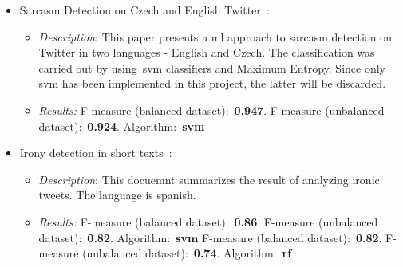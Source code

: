 \begin{itemize}
	\item Sarcasm Detection on Czech and English Twitter~\cite{ptavcek2014sarcasm}:
	\begin{itemize}
		\item \textit{Description}: This paper presents a \ac{ml} approach to sarcasm detection on Twitter in two languages - English and Czech. The classification was carried out by using~\ac{svm} classifiers and Maximum Entropy. Since only \ac{svm} has been implemented in this project, the latter will be discarded.
		\item \textit{Results:} F-measure (balanced dataset):~\textbf{0.947}. F-measure (unbalanced dataset):~\textbf{0.924}. Algorithm:~\textbf{\ac{svm}}
	\end{itemize}
	\item Irony detection in short texts~\cite{mexic}:
	\begin{itemize}
		\item \textit{Description}: This docuemnt summarizes the result of analyzing ironic tweets. The language is spanish.
		\item \textit{Results:} F-measure (balanced dataset):~\textbf{0.86}. F-measure (unbalanced dataset):~\textbf{0.82}. Algorithm:~\textbf{\ac{svm}}
		F-measure (balanced dataset):~\textbf{0.82}. F-measure (unbalanced dataset):~\textbf{0.74}. Algorithm:~\textbf{\ac{rf}}
	\end{itemize}
	
\end{itemize}